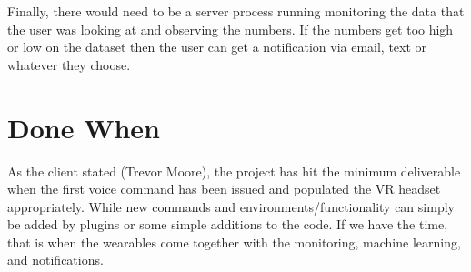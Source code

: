 \documentclass[onecolumn, draftclsnofoot,10pt, compsoc]{IEEEtran}
\begin{document}
Finally, there would need to be a server process running monitoring the data that the user was looking at and observing the numbers. If the numbers get too high or low on the dataset then the user can get a notification via email, text or whatever they choose.

\newpage

\section{Done When}

As the client stated (Trevor Moore), the project has hit the minimum deliverable when the first voice command has been issued and populated the VR headset appropriately. While new commands and environments/functionality can simply be added by plugins or some simple additions to the code. If we have the time, that is when the wearables come together with the monitoring, machine learning, and notifications.
\end{document}
